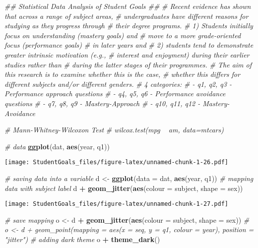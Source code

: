 \documentclass[]{article}
\newenvironment{Shaded}{\begin{snugshade}}{\end{snugshade}}
\newcommand{\CommentTok}[1]{\textcolor[rgb]{0.56,0.35,0.01}{\textit{#1}}}
\newcommand{\DataTypeTok}[1]{\textcolor[rgb]{0.13,0.29,0.53}{#1}}
\newcommand{\KeywordTok}[1]{\textcolor[rgb]{0.13,0.29,0.53}{\textbf{#1}}}
\newcommand{\NormalTok}[1]{#1}
\newcommand{\OperatorTok}[1]{\textcolor[rgb]{0.81,0.36,0.00}{\textbf{#1}}}
\newcommand{\StringTok}[1]{\textcolor[rgb]{0.31,0.60,0.02}{#1}}
\begin{document}
\begin{Shaded}
\begin{Highlighting}[]
\CommentTok{## Statistical Data Analysis of Student Goals ##}
\CommentTok{# Recent evidence has shown that across a range of subject areas, }
\CommentTok{# undergraduates have different reasons for studying as they progress through}
\CommentTok{# their degree programs. }
\CommentTok{# 1) Students initially focus on understanding (mastery goals) and}
\CommentTok{# move to a more grade-oriented focus (performance goals) }
\CommentTok{# in later years and }
\CommentTok{# 2) students tend to demonstrate greater intrinsic motivation (e.g., }
\CommentTok{# interest and enjoyment) during their earlier studies rather than }
\CommentTok{# during the latter stages of their programmes.}
\CommentTok{# The aim of this research is to examine whether this is the case, }
\CommentTok{# whether this differs for different subjects and/or different genders.}
\CommentTok{# 4 categories:}
\CommentTok{# - q1, q2, q3 - Performance approach questions}
\CommentTok{# - q4, q5, q6 - Performance avoidance questions}
\CommentTok{# - q7, q8, q9 - Mastery-Approach}
\CommentTok{# - q10, q11, q12 - Mastery-Avoidance}

\CommentTok{# Mann-Whitney-Wilcoxon Test}
\CommentTok{# wilcox.test(mpg ~ am, data=mtcars) }

\CommentTok{# data}
\KeywordTok{ggplot}\NormalTok{(dat, }\KeywordTok{aes}\NormalTok{(year, q1))}
\end{Highlighting}
\end{Shaded}

\texttt{[image: StudentGoals\_files/figure-latex/unnamed-chunk-1-26.pdf]}

\begin{Shaded}
\begin{Highlighting}[]
\CommentTok{# saving data into a variable}
\NormalTok{d <-}\StringTok{ }\KeywordTok{ggplot}\NormalTok{(}\DataTypeTok{data =}\NormalTok{ dat, }\KeywordTok{aes}\NormalTok{(year, q1))}
\CommentTok{# mapping data with subject label}
\NormalTok{d }\OperatorTok{+}\StringTok{ }\KeywordTok{geom_jitter}\NormalTok{(}\KeywordTok{aes}\NormalTok{(}\DataTypeTok{colour =}\NormalTok{ subject, }\DataTypeTok{shape =}\NormalTok{ sex))}
\end{Highlighting}
\end{Shaded}

\texttt{[image: StudentGoals\_files/figure-latex/unnamed-chunk-1-27.pdf]}

\begin{Shaded}
\begin{Highlighting}[]
\CommentTok{# save mapping}
\NormalTok{o <-}\StringTok{ }\NormalTok{d }\OperatorTok{+}\StringTok{ }\KeywordTok{geom_jitter}\NormalTok{(}\KeywordTok{aes}\NormalTok{(}\DataTypeTok{colour =}\NormalTok{ subject, }\DataTypeTok{shape =}\NormalTok{ sex))}
\CommentTok{# o <- d + geom_point(mapping = aes(x = seq, y = q1, colour = year), position = "jitter")}
\CommentTok{# adding dark theme}
\NormalTok{o }\OperatorTok{+}\StringTok{ }\KeywordTok{theme_dark}\NormalTok{()}
\end{Highlighting}
\end{Shaded}
\end{document}

